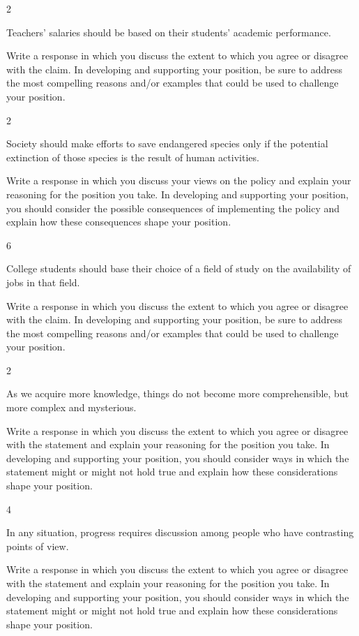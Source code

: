 \documentclass[]{article}
\begin{document}
2

Teachers' salaries should be based on their students' academic
performance.

Write a response in which you discuss the extent to which you agree or
disagree with the claim. In developing and supporting your position, be
sure to address the most compelling reasons and/or examples that could
be used to challenge your position.

2

Society should make efforts to save endangered species only if the
potential extinction of those species is the result of human activities.

Write a response in which you discuss your views on the policy and
explain your reasoning for the position you take. In developing and
supporting your position, you should consider the possible consequences
of implementing the policy and explain how these consequences shape your
position.

6

College students should base their choice of a field of study on the
availability of jobs in that field.

Write a response in which you discuss the extent to which you agree or
disagree with the claim. In developing and supporting your position, be
sure to address the most compelling reasons and/or examples that could
be used to challenge your position.

2

As we acquire more knowledge, things do not become more comprehensible,
but more complex and mysterious.

Write a response in which you discuss the extent to which you agree or
disagree with the statement and explain your reasoning for the position
you take. In developing and supporting your position, you should
consider ways in which the statement might or might not hold true and
explain how these considerations shape your position.

4

In any situation, progress requires discussion among people who have
contrasting points of view.

Write a response in which you discuss the extent to which you agree or
disagree with the statement and explain your reasoning for the position
you take. In developing and supporting your position, you should
consider ways in which the statement might or might not hold true and
explain how these considerations shape your position.
\end{document}
